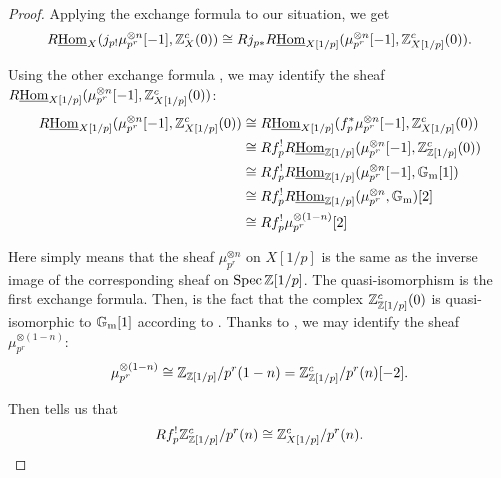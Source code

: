 \begin{proof}
  Applying the exchange formula  to our situation, we get
  \begin{equation}
    R\underline{\operatorname{Hom}}_X (j_{p!} \mu_{p^r}^{\otimes n} [-1], \mathbb{Z}^c_X (0)) \cong
    R j_{p*} R\underline{\operatorname{Hom}}_{X [1/p]} (\mu_{p^r}^{\otimes n} [-1], \mathbb{Z}^c_{X [1/p]} (0)).
  \end{equation}

  Using the other exchange formula , we may
  identify the sheaf
  $R\underline{\operatorname{Hom}}_{X [1/p]} (\mu_{p^r}^{\otimes n} [-1], \mathbb{Z}^c_{X [1/p]} (0))$:
  \begin{align}
    \label{eqn:inverse-image-of-mu} R\underline{\operatorname{Hom}}_{X [1/p]} (\mu_{p^r}^{\otimes n} [-1], \mathbb{Z}^c_{X [1/p]} (0)) & \cong R\underline{\operatorname{Hom}}_{X[1/p]} (f_p^* \mu_{p^r}^{\otimes n} [-1], \mathbb{Z}^c_{X [1/p]} (0)) \\
    \label{eqn:exchange-formula-applied} & \cong R f^!_p R\underline{\operatorname{Hom}}_{\mathbb{Z} [1/p]} (\mu_{p^r}^{\otimes n} [-1], \mathbb{Z}^c_{\mathbb{Z} [1/p]} (0)) \\
    \label{eqn:identification-of-Zc0-with-Gm} & \cong R f^!_p R\underline{\operatorname{Hom}}_{\mathbb{Z} [1/p]} (\mu_{p^r}^{\otimes n} [-1], \mathbb{G}_\mathrm{m} [1]) \\
                                                                                                       & \cong R f^!_p R\underline{\operatorname{Hom}}_{\mathbb{Z} [1/p]} (\mu_{p^r}^{\otimes n}, \mathbb{G}_\mathrm{m}) [2] \\
                                                                                                       & \cong R f^!_p \mu_{p^r}^{\otimes (1-n)} [2]
  \end{align}

  Here  simply means that the sheaf
  $\mu_{p^r}^{\otimes n}$ on $X[1/p]$ is the same as the inverse image of the
  corresponding sheaf on $\operatorname{Spec} \mathbb{Z} [1/p]$. The quasi-isomorphism
   is the first exchange formula. Then,
   is the fact that the complex
  $\mathbb{Z}^c_{\mathbb{Z} [1/p]} (0)$ is quasi-isomorphic to $\mathbb{G}_\mathrm{m} [1]$ according to
  \cite[Lemma 7.4]{Geisser-10}. Thanks to \cite[Theorem 1.2]{Geisser-04}, we may
  identify the sheaf $\mu_{p^r}^{\otimes (1-n)}$:
  \begin{equation}
    \mu_{p^r}^{\otimes (1-n)} \cong \mathbb{Z}_{\mathbb{Z} [1/p]}/p^r (1-n) = \mathbb{Z}^c_{\mathbb{Z} [1/p]}/p^r (n) [-2].
  \end{equation}

  Then \cite[Corollary 7.9]{Geisser-10} tells us that
  \begin{equation}
    R f^!_p \mathbb{Z}^c_{\mathbb{Z} [1/p]} / p^r (n) \cong \mathbb{Z}^c_{X [1/p]} / p^r (n).
  \end{equation}


\end{proof}
